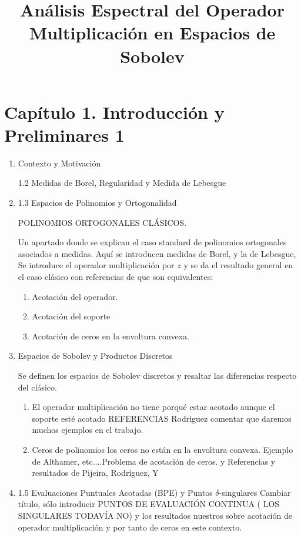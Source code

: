 \documentclass[12pt,a4paper]{article}
\title{Análisis Espectral del Operador Multiplicación en Espacios de Sobolev}
\author{}
\date{}
\theoremstyle{definition}
\theoremstyle{remark}
\begin{document}
\maketitle
\section{Capítulo 1. Introducción y Preliminares 1 }
\begin{enumerate}
  


   
\item  Contexto y Motivación




1.2 Medidas de Borel, Regularidad y Medida de Lebesgue 



\item 1.3 Espacios de Polinomios y Ortogonalidad 

POLINOMIOS ORTOGONALES CLÁSICOS. 

Un apartado donde se explican el caso standard de polinomios ortogonales asociados a medidas. Aquí se introducen medidas de Borel, y la de Lebesgue, 
Se introduce el operador multiplicación por $z$ y se da el resultado general en el caso clásico con referencias de que son equivalentes: 
\begin{enumerate}
\item Acotación del operador. 
\item Acotación del soporte 
\item Acotación de ceros en la envoltura convexa.  
\end{enumerate}
\item  Espacios de Sobolev y Productos Discretos

\noindent Se definen los espacios de Sobolev discretos y resaltar las diferencias respecto del clásico. 

\begin{enumerate}
    \item El operador multiplicación no tiene porqué estar acotado aunque el soporte esté acotado REFERENCIAS Rodriguez comentar que daremos muchos ejemplos en el trabajo. 
    \item Ceros de polinomios los ceros no están en la envoltura convexa. Ejemplo de Althamer, etc....Problema de acotación de ceros. y Referencias y resultados de Pijeira, Rodríguez, Y 
\end{enumerate}

\item 1.5 Evaluaciones Puntuales Acotadas (BPE) y Puntos $\delta$-singulares  Cambiar título, sólo introducir  PUNTOS DE EVALUACIÓN CONTINUA ( LOS SINGULARES TODAVÍA NO) y los resultados nuestros 
sobre acotación de operador multiplicación y por tanto de ceros en este contexto. 
\end{enumerate}
\end{document}

